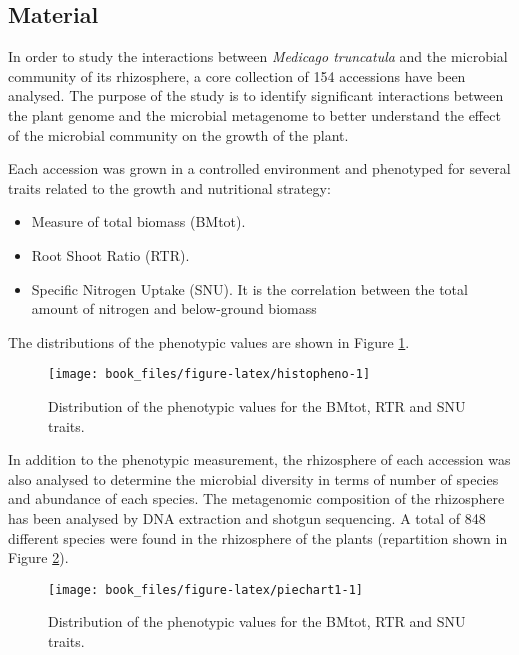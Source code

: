 \documentclass[]{book}
\begin{document}
\hypertarget{material}{%
\subsection{Material}\label{material}}

In order to study the interactions between \emph{Medicago truncatula} and the
microbial community of its rhizosphere, a core collection of 154
accessions have been analysed. The purpose of the study is to identify
significant interactions between the plant genome and the microbial
metagenome to better understand the effect of the microbial community on
the growth of the plant.

Each accession was grown in a controlled environment and phenotyped for
several traits related to the growth and nutritional strategy:

\begin{itemize}
\item
  Measure of total biomass (BMtot).
\item
  Root Shoot Ratio (RTR).
\item
  Specific Nitrogen Uptake (SNU). It is the correlation between the
  total amount of nitrogen and below-ground biomass
\end{itemize}

The distributions of the phenotypic values are shown in Figure
\ref{fig:histopheno}.



\begin{figure}

{\centering \texttt{[image: book\_files/figure-latex/histopheno-1]} 

}

\caption{Distribution of the phenotypic values for the BMtot, RTR and SNU traits.}\label{fig:histopheno}
\end{figure}

In addition to the phenotypic measurement, the rhizosphere of each
accession was also analysed to determine the microbial diversity in
terms of number of species and abundance of each species. The
metagenomic composition of the rhizosphere has been analysed by DNA
extraction and shotgun sequencing. A total of 848 different species were
found in the rhizosphere of the plants (repartition shown in Figure
\ref{fig:piechart1}).



\begin{figure}

{\centering \texttt{[image: book\_files/figure-latex/piechart1-1]} 

}

\caption{Distribution of the phenotypic values for the BMtot, RTR and SNU traits.}\label{fig:piechart1}
\end{figure}
\end{document}
